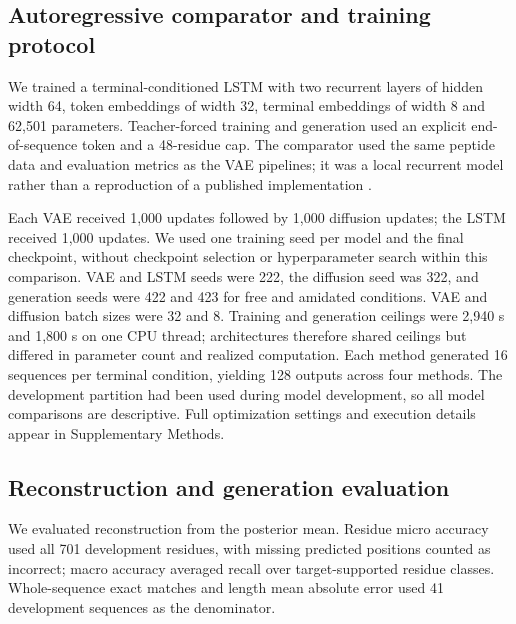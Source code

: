 \documentclass[unnumsec,webpdf,contemporary,large]{oup-authoring-template}
\begin{document}
\subsection{Autoregressive comparator and training protocol}

We trained a terminal-conditioned LSTM \cite{refLSTM} with two recurrent layers of hidden width 64, token embeddings of width 32, terminal embeddings of width 8 and 62,501 parameters. Teacher-forced training and generation used an explicit end-of-sequence token and a 48-residue cap. The comparator used the same peptide data and evaluation metrics as the VAE pipelines; it was a local recurrent model rather than a reproduction of a published implementation \cite{ref1}.

Each VAE received 1,000 updates followed by 1,000 diffusion updates; the LSTM received 1,000 updates. We used one training seed per model and the final checkpoint, without checkpoint selection or hyperparameter search within this comparison. VAE and LSTM seeds were 222, the diffusion seed was 322, and generation seeds were 422 and 423 for free and amidated conditions. VAE and diffusion batch sizes were 32 and 8. Training and generation ceilings were 2,940 s and 1,800 s on one CPU thread; architectures therefore shared ceilings but differed in parameter count and realized computation. Each method generated 16 sequences per terminal condition, yielding 128 outputs across four methods. The development partition had been used during model development, so all model comparisons are descriptive. Full optimization settings and execution details appear in Supplementary Methods.

\subsection{Reconstruction and generation evaluation}

We evaluated reconstruction from the posterior mean. Residue micro accuracy used all 701 development residues, with missing predicted positions counted as incorrect; macro accuracy averaged recall over target-supported residue classes. Whole-sequence exact matches and length mean absolute error used 41 development sequences as the denominator.
\end{document}
